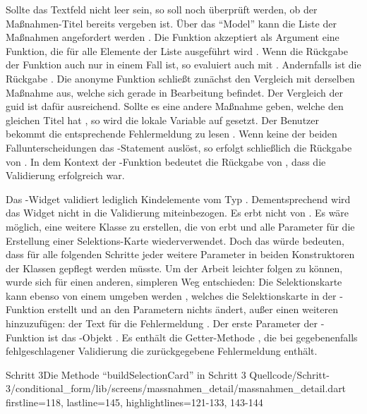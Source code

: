 Sollte das Textfeld nicht leer sein, so soll noch überprüft werden, ob der Maßnahmen-Titel bereits vergeben ist.
Über das \enquote{Model} kann die Liste der Maßnahmen angefordert werden .
Die Funktion  akzeptiert als Argument eine Funktion, die für alle Elemente der Liste ausgeführt wird .
Wenn die Rückgabe der Funktion auch nur in einem Fall  ist, so evaluiert auch  mit .
Andernfalls ist die Rückgabe . 
Die anonyme Funktion schließt zunächst den Vergleich mit derselben Maßnahme aus, welche sich gerade in Bearbeitung befindet.
Der Vergleich der guid ist dafür ausreichend.
Sollte es eine andere Maßnahme geben, welche den gleichen Titel hat , so wird die lokale Variable  auf  gesetzt.
Der Benutzer bekommt die entsprechende Fehlermeldung  zu lesen .
Wenn keine der beiden Fallunterscheidungen das -Statement  auslöst, so erfolgt schließlich die Rückgabe von .
In dem Kontext der -Funktion bedeutet die Rückgabe von  , dass die Validierung erfolgreich war.
 

 
Das -Widget validiert lediglich Kindelemente vom Typ .
Dementsprechend wird das Widget  nicht in die Validierung miteinbezogen.
Es erbt nicht von .
Es wäre möglich, eine weitere Klasse zu erstellen, die von  erbt und alle Parameter für die Erstellung einer Selektions-Karte wiederverwendet.
Doch das würde bedeuten, dass für alle folgenden Schritte jeder weitere Parameter in beiden Konstruktoren der Klassen gepflegt werden müsste.
Um der Arbeit leichter folgen zu können, wurde sich für einen anderen, simpleren Weg entschieden: 
Die Selektionskarte kann ebenso von einem  umgeben werden , welches die Selektionskarte in der -Funktion erstellt und an den Parametern nichts ändert, außer einen weiteren hinzuzufügen: der Text für die Fehlermeldung .
Der erste Parameter der -Funktion ist das -Objekt .
Es enthält die Getter-Methode , die bei gegebenenfalls fehlgeschlagener Validierung die zurückgegebene Fehlermeldung enthält.

\begin{alexlisting}{Schritt 3}{Die Methode \enquote{buildSelectionCard} in Schritt 3}
    {Quellcode/Schritt-3/conditional_form/lib/screens/massnahmen_detail/massnahmen_detail.dart}
    {firstline=118, lastline=145, highlightlines={121-133, 143-144}}
    \label{lst:Schritt3buildSelectionCardValidator}
\end{alexlisting}

